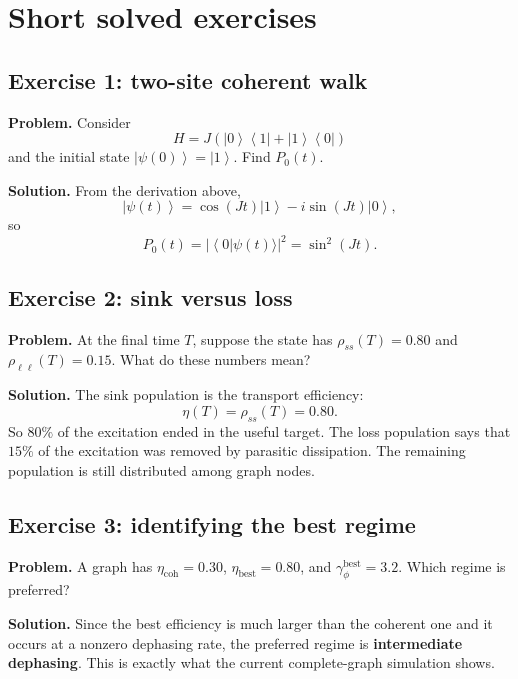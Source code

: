 \documentclass[11pt,a4paper]{article}
\newcommand{\ket}[1]{\left|#1\right\rangle}
\newcommand{\bra}[1]{\left\langle#1\right|}
\begin{document}
\section{Short solved exercises}

\subsection*{Exercise 1: two-site coherent walk}

\textbf{Problem.} Consider
\begin{equation}
H = J(\ket{0}\bra{1}+\ket{1}\bra{0})
\end{equation}
and the initial state $\ket{\psi(0)}=\ket{1}$. Find $P_0(t)$.

\textbf{Solution.} From the derivation above,
\begin{equation}
\ket{\psi(t)}=\cos(Jt)\ket{1}-i\sin(Jt)\ket{0},
\end{equation}
so
\begin{equation}
P_0(t)=|\bra{0}\psi(t)\rangle|^2=\sin^2(Jt).
\end{equation}

\subsection*{Exercise 2: sink versus loss}

\textbf{Problem.} At the final time $T$, suppose the state has $\rho_{ss}(T)=0.80$ and $\rho_{\ell\ell}(T)=0.15$. What do these numbers mean?

\textbf{Solution.} The sink population is the transport efficiency:
\begin{equation}
\eta(T)=\rho_{ss}(T)=0.80.
\end{equation}
So $80\%$ of the excitation ended in the useful target. The loss population says that $15\%$ of the excitation was removed by parasitic dissipation. The remaining population is still distributed among graph nodes.

\subsection*{Exercise 3: identifying the best regime}

\textbf{Problem.} A graph has $\eta_{\mathrm{coh}}=0.30$, $\eta_{\mathrm{best}}=0.80$, and $\gamma_{\phi}^{\mathrm{best}}=3.2$. Which regime is preferred?

\textbf{Solution.} Since the best efficiency is much larger than the coherent one and it occurs at a nonzero dephasing rate, the preferred regime is \textbf{intermediate dephasing}. This is exactly what the current complete-graph simulation shows.
\end{document}
